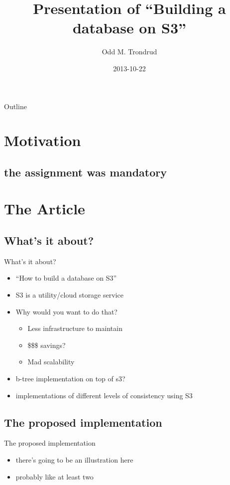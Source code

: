 \documentclass{beamer}
\title[Building a database on S3] %
{Presentation of ``Building a database on S3''}
\author[Odd M. Trondrud]{Odd M. Trondrud}
\institute[Norwegian University of Technology and Science] 
{
  Presentation of seminar article\\
  TDT4150 ``Avanserte Databasesystemer''\\
  autumn semester of 2013\\
  NTNU
}
\date[]
{2013-10-22}
\begin{document}
\begin{frame}
  \titlepage
\end{frame}

\begin{frame}{Outline}
  \tableofcontents
\end{frame}



\section{Motivation}

\subsection{the assignment was mandatory}

\section{The Article}
  \subsection{What's it about?}

    \begin{frame}{What's it about?}
      \begin{itemize}
      \item
        ``How to build a database on S3''
      \item
        S3 is a utility/cloud storage service
      \item
        Why would you want to do that?
        \begin{itemize}
        \item
          Less infrastructure to maintain
        \item
          \$\$\$ savings?
        \item
          Mad scalability
        \end{itemize}
      \item
        b-tree implementation on top of s3?
      \item
        implementations of different levels of consistency using S3
      \end{itemize}
    \end{frame}

\subsection{The proposed implementation}
  \begin{frame}{The proposed implementation}
    \begin{itemize}
      \item
        there's going to be an illustration here
      \item
        probably like at least two
    \end{itemize}
  \end{frame}
\end{document}
